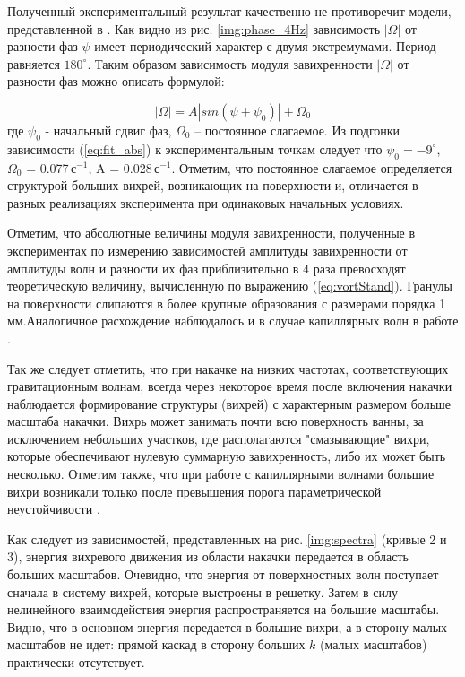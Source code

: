 Полученный экспериментальный результат качественно не противоречит модели, представленной в \cite{F6}. Как видно из рис. \ref{img:phase_4Hz} зависимость $|\Omega|$ от разности фаз $\psi$ имеет периодический характер с двумя экстремумами. Период равняется $180^\circ$. Таким образом зависимость модуля завихренности $|\Omega|$ от разности фаз можно описать формулой: 

\begin{equation}\label{eq:fit_abs}
|\Omega| = A |sin(\psi+\psi_0)| + \Omega_0
\end{equation}
где $\psi_0$ - начальный сдвиг фаз, $\Omega_0$ – постоянное слагаемое. Из подгонки зависимости (\ref{eq:fit_abs}) к экспериментальным точкам следует что $\psi_0 = -9^\circ$, $\Omega_0$ = 0.077\,с$^{-1}$, A = 0.028\,с$^{-1}$. Отметим, что постоянное слагаемое определяется структурой больших вихрей, возникающих на поверхности и, отличается в разных реализациях эксперимента при одинаковых начальных условиях. 

Отметим, что абсолютные величины модуля завихренности, полученные в экспериментах по измерению зависимостей амплитуды завихренности от амплитуды волн и разности их фаз приблизительно в 4 раза превосходят теоретическую величину, вычисленную по выражению (\ref{eq:vortStand}). Гранулы на поверхности слипаются в более крупные образования с размерами порядка 1 мм.Аналогичное расхождение наблюдалось и в случае капиллярных волн в работе \cite{F6}. 

Так же следует отметить, что при накачке на низких частотах, соответствующих гравитационным волнам, всегда через некоторое время после включения накачки наблюдается формирование структуры (вихрей) с характерным размером больше масштаба накачки. Вихрь может занимать почти всю поверхность ванны, за исключением небольших участков, где располагаются "смазывающие" вихри, которые обеспечивают нулевую суммарную завихренность, либо их может быть несколько. Отметим также, что при работе с капиллярными волнами большие вихри возникали только после превышения порога параметрической неустойчивости \cite{Francois2013}. 

Как следует из зависимостей, представленных на рис. \ref{img:spectra} (кривые 2 и 3), энергия вихревого движения из области накачки передается в область больших масштабов. Очевидно, что энергия от поверхностных волн поступает сначала в систему вихрей, которые выстроены в решетку. Затем в силу нелинейного взаимодействия энергия распространяется на большие масштабы. Видно, что в основном энергия передается в большие вихри, а в сторону малых масштабов не идет: прямой каскад в сторону больших $k$ (малых масштабов) практически отсутствует.

